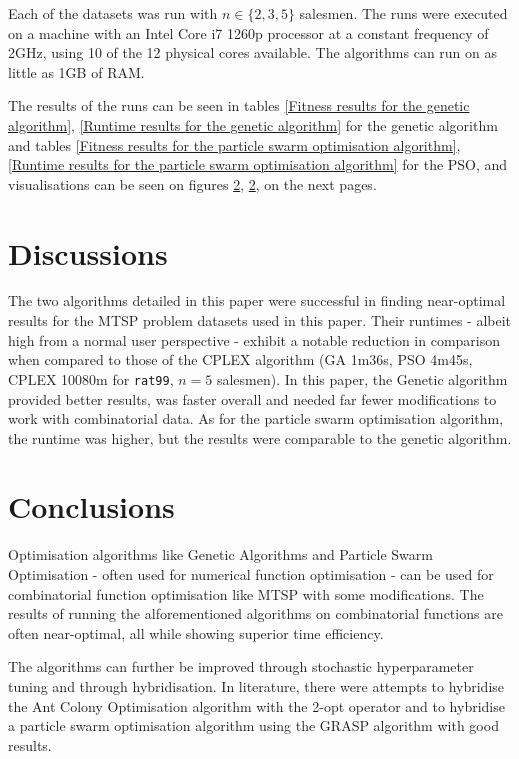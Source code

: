 \documentclass[conference]{IEEEtran}
\begin{document}
Each of the datasets was run with $n \in \{2, 3, 5\}$ salesmen. The runs were executed on a machine with an Intel Core i7
1260p processor at a constant frequency of 2GHz, using 10 of the 12 physical cores available. The algorithms can run on as
little as 1GB of RAM.

The results of the runs can be seen in tables \ref{Fitness results for the genetic algorithm},
\ref{Runtime results for the genetic algorithm} for the genetic algorithm and tables
\ref{Fitness results for the particle swarm optimisation algorithm}, \ref{Runtime results for the particle swarm optimisation algorithm}
for the PSO, and visualisations can be seen on figures \ref{}, \ref{}, on the next pages.

\section{Discussions}
The two algorithms detailed in this paper were successful in finding near-optimal results for the MTSP problem datasets used
in this paper. Their runtimes - albeit high from a normal user perspective - exhibit a notable reduction in comparison when
compared to those of the CPLEX algorithm (GA 1m36s, PSO 4m45s, CPLEX 10080m for \texttt{rat99}, $n = 5$ salesmen). In this paper,
the Genetic algorithm provided better results, was faster overall and needed far fewer modifications to work with combinatorial
data. As for the particle swarm optimisation algorithm, the runtime was higher, but the results were comparable to the genetic
algorithm.

\section{Conclusions}
Optimisation algorithms like Genetic Algorithms and Particle Swarm Optimisation - often used for numerical function optimisation -
can be used for combinatorial function optimisation like MTSP with some modifications. The results of running the alforementioned
algorithms on combinatorial functions are often near-optimal, all while showing superior time efficiency.

The algorithms can further be improved through stochastic hyperparameter tuning and through hybridisation. In literature, there were
attempts to hybridise the Ant Colony Optimisation algorithm with the 2-opt operator \cite{b12} and to hybridise a particle swarm
optimisation algorithm using the GRASP algorithm \cite{b8} with good results.
\end{document}
